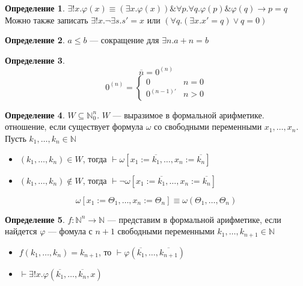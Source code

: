 \documentclass[oneside]{book}
\newcommand{\N}{\mathbb{N}}
\theoremstyle{plain}
\theoremstyle{remark}
\theoremstyle{definition}
\newtheorem*{definition}{Определение}
\begin{document}
\begin{definition}
\(\exists! x.\varphi(x) \equiv (\exists x. \varphi(x))\&\forall p.\forall q. \varphi(p)\&\varphi(q) \to p = q\) \\
Можно также записать \(\exists ! x.\neg \exists s. s' = x\) или \((\forall q.(\exists x. x' = q)\vee q= 0)\)
\end{definition}
\begin{definition}
\(a \le b\) --- сокращение для \(\exists n. a + n = b\)
\end{definition}
\begin{definition}
\[ \overline{n} = 0^{(n)}\]
\[ 0^{(n)} = \begin{cases}
0 & n = 0 \\
0^{(n - 1)'} & n > 0
\end{cases}\]
\end{definition}
\begin{definition}
\(W \subseteq \N_0^n\). \(W\) --- выразимое в формальной арифметике. отношение, если существует формула \(\omega\) со свободными переменными \(x_1,\dots,x_n\). Пусть \(k_1,\dots,k_n \in \N\)
\begin{itemize}
\item \((k_1,\dots,k_n) \in W\), тогда \(\vdash \omega[x_1:=\overline{k_1}, \dots, x_n := \overline{k_n}]\)
\item \((k_1,\dots,k_n) \not\in W\), тогда \(\vdash \neg \omega[x_1:=\overline{k_1},\dots,x_n:=\overline{k_n}]\)
\end{itemize}
\[ \omega[x_1:=\Theta_1,\dots,x_n:=\Theta_n] \equiv \omega(\Theta_1, \dots, \Theta_n) \]
\end{definition}
\begin{definition}
\(f: \N^n \to \N\) --- представим в формальной арифметике, если найдется \(\varphi\) --- фомула с \(n + 1\) свободными переменными \(k_1, \dots, k_{n + 1} \in \N\)
\begin{itemize}
\item \(f(k_1,\dots,k_n) = k_{n + 1}\), то \(\vdash \varphi(\overline{k_1},\dots,\overline{k_{n + 1}})\) \\
\item \(\vdash \exists! x.\varphi(\overline{k_1},\dots,\overline{k_n},x)\)
\end{itemize}
\end{definition}
\end{document}

